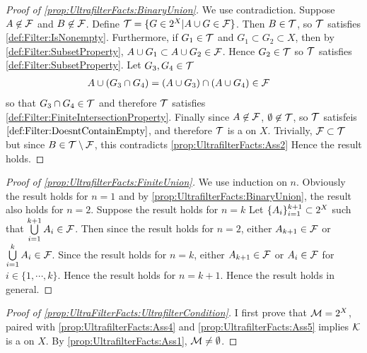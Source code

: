\begin{prop}
    \begin{proof}[Proof of \ref{prop:UltrafilterFacts:BinaryUnion}]
        We use contradiction.
        Suppose $A \not \in \mathcal{F}$ and $B \not \in \mathcal{F}$. 
        Define $\mathcal{T}=\{G \in 2^{X} | A \cup G \in \mathcal{F}\}$. 
        Then $B \in \mathcal{T}$, so $\mathcal{T}$ satisfies 
        \ref{def:Filter:IsNonempty}.
        Furthermore, if $G_1 \in \mathcal{T}$ and $G_1 \subset G_2 \subset X$, then 
        by \ref{def:Filter:SubsetProperty},  
        $A \cup G_1 \subset A \cup G_2 \in \mathcal{F}$. Hence $G_2 \in \mathcal{T}$ so 
        $\mathcal{T}$ satisfies \ref{def:Filter:SubsetProperty}.
        Let $G_3,G_4 \in \mathcal{T}$ 
        \begin{align*}
            A \cup \left( G_3 \cap G_4\right) & = \left( A \cup G_3\right) \cap \left( A \cup G_4\right) \in \mathcal{F}
        \end{align*}
        so that $G_3 \cap G_4 \in \mathcal{T}$ and therefore $\mathcal{T}$ satisfies
        \ref{def:Filter:FiniteIntersectionProperty}.
        Finally since $A \not \in \mathcal{F}$, $\emptyset \not \in \mathcal{T}$, so 
        $\mathcal{T}$ satisfeis $\ref{def:Filter:DoesntContainEmpty}$, and therefore 
        $\mathcal{T}$ is a \Filter on $X$. 
        Trivially, $\mathcal{F} \subset \mathcal{T}$ but since $B \in \mathcal{T} \setminus \mathcal{F}$, 
        this contradicts
        \ref{prop:UltrafilterFacts:Ass2}
        Hence the result holds. 
    \end{proof}
    \begin{proof}[Proof of \ref{prop:UltrafilterFacts:FiniteUnion}]
        We use induction on $n$. Obviously the result holds for $n=1$ 
        and by \ref{prop:UltrafilterFacts:BinaryUnion}, the result
        also holds for $n=2$. 
        Suppose the result holds for $n=k$ 
        Let $\{A_i\}_{i=1}^{k+1} \subset 2^{X}$ such that
        $\bigcup\limits_{i=1}^{k+1} A_i \in \mathcal{F}$. 
        Then since the result holds for $n=2$, either 
        $A_{k+1} \in \mathcal{F}$ or $\bigcup\limits_{i=1}^k A_i \in \mathcal{F}$. 
        Since the result holds for $n=k$, either
        $A_{k+1} \in \mathcal{F}$ or $A_i \in \mathcal{F}$ for $i \in \{1, \cdots, k\}$. 
        Hence the result holds for $n=k+1$.
        Hence the result holds in general. 
    \end{proof}
    \begin{proof}[Proof of \ref{prop:UltraFilterFacts:UltrafilterCondition}]
        I first prove that $\mathcal{M}=2^{X}$, 
        paired with 
        \ref{prop:UltrafilterFacts:Ass4} and 
        \ref{prop:UltrafilterFacts:Ass5} 
        implies $\mathcal{K}$ is a \Filter
        on $X$.
        By \ref{prop:UltrafilterFacts:Ass1}, $\mathcal{M} \neq \emptyset$. 

\end{proof}
\end{prop}
